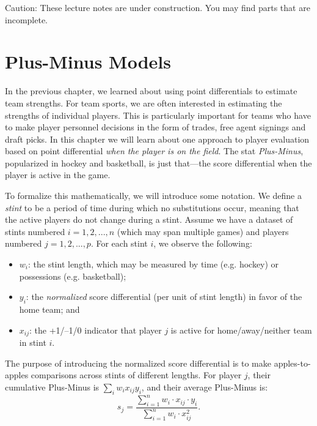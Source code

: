 \documentclass{article}
\begin{document}
  \begin{framed}
    {\sc Caution:} These lecture notes are under construction. You may find parts that are incomplete.
  \end{framed}

  \setcounter{section}{3}
  \section{\sc Plus-Minus Models}

  In the previous chapter, we learned about using point differentials to estimate team strengths. For team sports, we are often interested in estimating the strengths of individual players. This is particularly important for teams who have to make player personnel decisions in the form of trades, free agent signings and draft picks. In this chapter we will learn about one approach to player evaluation based on point differential {\it when the player is on the field}. The stat {\it Plus-Minus}, popularized in hockey and basketball, is just that---the score differential when the player is active in the game.
  
  To formalize this mathematically, we will introduce some notation. We define a {\it stint} to be a period of time during which no substitutions occur, meaning that the active players do not change during a stint. Assume we have a dataset of stints numbered $i = 1, 2, ..., n$ (which may span multiple games) and players numbered $j = 1, 2, ..., p$. For each stint $i$, we observe the following:
  \begin{itemize}
    \item $w_i$: the stint length, which may be measured by time (e.g. hockey) or possessions (e.g. basketball);
    \item $y_i$: the {\it normalized} score differential (per unit of stint length) in favor of the home team; and
    \item $x_{ij}$: the +1/--1/0 indicator that player $j$ is active for home/away/neither team in stint $i$.
  \end{itemize}
  The purpose of introducing the normalized score differential is to make apples-to-apples comparisons across stints of different lengths. For player $j$, their cumulative Plus-Minus is $\sum_i w_ix_{ij}y_i$, and their average Plus-Minus is:
  \begin{equation}
    \label{eqn-plus-minus}
    s_j = \frac{
      \sum_{i = 1}^n w_i \cdot x_{ij} \cdot y_i
    }{
      \sum_{i = 1}^n w_i \cdot x_{ij}^2
    }.
  \end{equation}
\end{document}
